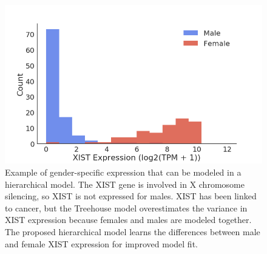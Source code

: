 \documentclass[fleqn,10pt]{wlscirep}
\begin{document}
\begin{figure}
\centering
\includegraphics[width=0.75\linewidth]{images/xist-fig-2017-12-28.png}
\caption{Example of gender-specific expression that can be modeled in a hierarchical model. The XIST gene is involved in X chromosome silencing, so XIST is not expressed for males. XIST has been linked to cancer, but the Treehouse model overestimates the variance in XIST expression because females and males are modeled together. The proposed hierarchical model learns the differences between male and female XIST expression for improved model fit.}
\label{sfig:xist}
\end{figure}
\end{document}
